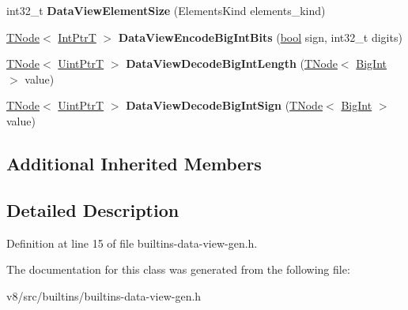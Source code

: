 \begin{DoxyCompactItemize}
\item 
\mbox{\label{classv8_1_1internal_1_1DataViewBuiltinsAssembler_a955f3adde90afc2605c1805aa532ccd9}} 
int32\+\_\+t {\bfseries Data\+View\+Element\+Size} (Elements\+Kind elements\+\_\+kind)
\item 
\mbox{\label{classv8_1_1internal_1_1DataViewBuiltinsAssembler_a3336da6970e1c23ddd268a815b0ab46a}} 
\mbox{\hyperlink{classv8_1_1internal_1_1compiler_1_1TNode}{T\+Node}}$<$ \mbox{\hyperlink{structv8_1_1internal_1_1IntPtrT}{Int\+PtrT}} $>$ {\bfseries Data\+View\+Encode\+Big\+Int\+Bits} (\mbox{\hyperlink{classbool}{bool}} sign, int32\+\_\+t digits)
\item 
\mbox{\label{classv8_1_1internal_1_1DataViewBuiltinsAssembler_a779cd89a4d190146f826b2c7d08147a6}} 
\mbox{\hyperlink{classv8_1_1internal_1_1compiler_1_1TNode}{T\+Node}}$<$ \mbox{\hyperlink{structv8_1_1internal_1_1UintPtrT}{Uint\+PtrT}} $>$ {\bfseries Data\+View\+Decode\+Big\+Int\+Length} (\mbox{\hyperlink{classv8_1_1internal_1_1compiler_1_1TNode}{T\+Node}}$<$ \mbox{\hyperlink{classv8_1_1internal_1_1BigInt}{Big\+Int}} $>$ value)
\item 
\mbox{\label{classv8_1_1internal_1_1DataViewBuiltinsAssembler_a946ee5970e06e31dcdc78af46fae1edb}} 
\mbox{\hyperlink{classv8_1_1internal_1_1compiler_1_1TNode}{T\+Node}}$<$ \mbox{\hyperlink{structv8_1_1internal_1_1UintPtrT}{Uint\+PtrT}} $>$ {\bfseries Data\+View\+Decode\+Big\+Int\+Sign} (\mbox{\hyperlink{classv8_1_1internal_1_1compiler_1_1TNode}{T\+Node}}$<$ \mbox{\hyperlink{classv8_1_1internal_1_1BigInt}{Big\+Int}} $>$ value)
\end{DoxyCompactItemize}
\subsection*{Additional Inherited Members}


\subsection{Detailed Description}


Definition at line 15 of file builtins-\/data-\/view-\/gen.\+h.



The documentation for this class was generated from the following file\+:\begin{DoxyCompactItemize}
\item 
v8/src/builtins/builtins-\/data-\/view-\/gen.\+h\end{DoxyCompactItemize}
